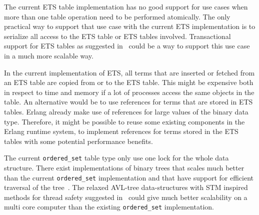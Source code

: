 \documentclass[aps,pre,preprint,nofootinbib]{revtex4}
\begin{document}
  The current ETS table implementation has no good support for use cases when more than one table operation need to be performed atomically.
  The only practical way to support that use case with the current ETS implementation is to serialize all access to the ETS table or ETS tables involved.
  Transactional support for ETS tables as suggested in~\cite{PatrikErlangTrans} could be a way to support this use case in a much more scalable way.
  
  In the current implementation of ETS, all terms that are inserted or fetched from an ETS table are copied from or to the ETS table.
  This might be expensive both in respect to time and memory if a lot of processes access the same objects in the table.
  An alternative would be to use references for terms that are stored in ETS tables. 
  Erlang already make use of references for large values of the binary data type.
  Therefore, it might be possible to reuse some existing components in the Erlang runtime system, to implement references for terms stored in the ETS tables with some potential performance benefits.
  
  The current \verb|ordered_set| table type only use one lock for the whole data structure. 
  There exist implementations of binary trees that scales much better than the current \verb|ordered_set| implementation and that have support for efficient traversal of the tree~\cite{BronsonPracTree}.
  The relaxed AVL-tree data-structures with STM inspired methods for thread safety suggested in~\cite{BronsonPracTree} could give much better scalability on a multi core computer than the existing \verb|ordered_set| implementation.
  

  


  
\end{document}
